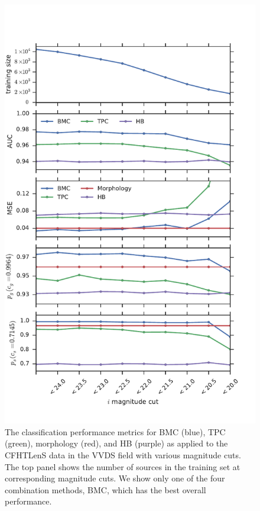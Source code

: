 \documentclass[useAMS,usenatbib]{mn2e}
\begin{document}
\begin{figure}
    \centering
    \includegraphics[width=\columnwidth]{figures/perform_mag_cut.pdf}
    \caption{The classification performance metrics for
      BMC (blue), TPC (green), morphology (red), and HB (purple)
      as applied to the CFHTLenS data in the VVDS field
      with various magnitude cuts.
      The top panel shows the number of sources in the training set
      at corresponding magnitude cuts.
      We show only one of the four combination methods, BMC,
      which has the best overall performance.}
    \label{fig:perform_mag_cut}
\end{figure}
\end{document}
